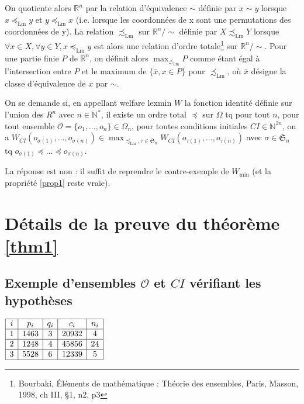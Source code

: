 \documentclass[a4paper]{article}
\newcommand{\N}{\mathbb{N}}
\newcommand{\R}{\mathbb{R}}
\newcommand{\Sg}{\mathfrak{S}}
\newcommand{\Oc}{\mathcal{O}}
\newcommand{\Lm}{\preceq_\mathrm{Lm}} %
\newcommand{\Lms}{\precsim_\mathrm{Lm}}
\newtheorem[style=S, bodystyle=\noindent]{thm}{Théorème}[section]
\newtheorem[style=S, bodystyle=\noindent]{defn}[thm]{Définition}
\newtheorem[style=S, bodystyle=\noindent]{propo}[thm]{Proposition}
\newtheorem[style=S, bodystyle=\noindent]{prop}[thm]{Propriété}
\newtheorem[style=S, bodystyle=\noindent]{coro}[thm]{Corollaire}
\newtheorem[style=S, bodystyle=\noindent]{lem}[thm]{Lemme}
\newtheorem[style=S, headstyle=\bfseries\boldmath Théorème, bodystyle=\noindent]{thm*}{Théorème}
\newtheorem[style=S, headstyle=\bfseries\boldmath Définition, bodystyle=\noindent]{defn*}{Définition}
\newtheorem[style=S, headstyle=\bfseries\boldmath Proposition, bodystyle=\noindent]{propo*}{Proposition}
\newtheorem[style=S, headstyle=\bfseries\boldmath Propriété, bodystyle=\noindent]{prop*}{Propriété}
\newtheorem[style=S, headstyle=\bfseries\boldmath Corollaire, bodystyle=\noindent]{coro*}{Corollaire}
\newtheorem[style=S, headstyle=\bfseries\boldmath Lemme, bodystyle=\noindent]{lem*}{Lemme}
\begin{document}
\par
On quotiente alors $\R^n$ par la relation d'équivalence $\sim$ définie par $x\sim y$ lorsque $x \Lm y$ et $y \Lm x$ (i.e. lorsque les coordonnées de x sont une permutations des coordonnées de y). La relation $\Lms$ sur $\R^n/\sim$ définie par $X\Lms Y$ lorsque $\forall x \in X,\forall y \in Y, x\Lm y$ est alors une relation d'ordre totale\footnote{Bourbaki, \'Eléments de mathématique : Théorie des ensembles, Paris, Masson, 1998, ch III, \S 1, n2, p3} sur $\R^n/\sim$. Pour une partie finie $P$ de $\R^n$, on définit alors $\max_{\Lms}P$ comme étant égal à l'intersection entre $P$ et le maximum de $\{\bar x, x \in P\}$ pour $\Lms$, où $\bar x$ désigne la classe d'équivalence de $x$ par $\sim$.

\par
On se demande si, en appellant welfare lexmin $W$ la fonction identité définie sur l'union des $R^n$ avec $n\in\N^*$, il existe un ordre total $\preceq$ sur $\Omega$ tq pour tout $n$, pour tout ensemble $\Oc = \{o_1,\ldots,o_n\}\in\Omega_n$, pour toutes conditions initiales $CI\in\N^{2n}$, on a $W_{CI}(o_{\sigma(1)},\ldots,o_{\sigma(n)}) \in \max_{\Lms, \tau \in \Sg_n}W_{CI}(o_{\tau(1)}, \ldots, o_{\tau(n)})$ avec $\sigma \in \Sg_n$ tq $o_{\sigma(1)} \preceq \ldots \preceq o_{\sigma(n)}$.

La réponse est non : il suffit de reprendre le contre-exemple de $W_{\min}$ (et la propriété \ref{prop1} reste vraie).

\newpage
\appendix

\section{Détails de la preuve du théorème \ref{thm1}}

\subsection{Exemple d'ensembles $\Oc$ et $CI$ vérifiant les hypothèses}
\label{appendix1}
\begin{center}
$\begin{array}{|c|c|c|c|c|}
	\hline
	i & p_i & q_i & c_i & n_i \\
	\hline
	1 & 1463 & 3 & 20932 & 4 \\
	\hline
	2 & 1248 & 4 & 45856 & 24 \\
	\hline
	3 & 5528 & 6 & 12339 & 5 \\
	\hline
\end{array}$
\end{center}
\end{document}
